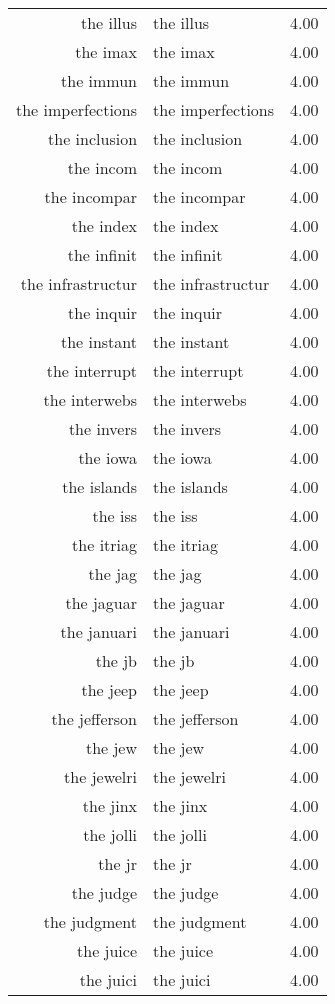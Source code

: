 \begin{table}[ht]
\begin{tabular}{rlr}
  the illus & the illus & 4.00 \\ 
  the imax & the imax & 4.00 \\ 
  the immun & the immun & 4.00 \\ 
  the imperfections & the imperfections & 4.00 \\ 
  the inclusion & the inclusion & 4.00 \\ 
  the incom & the incom & 4.00 \\ 
  the incompar & the incompar & 4.00 \\ 
  the index & the index & 4.00 \\ 
  the infinit & the infinit & 4.00 \\ 
  the infrastructur & the infrastructur & 4.00 \\ 
  the inquir & the inquir & 4.00 \\ 
  the instant & the instant & 4.00 \\ 
  the interrupt & the interrupt & 4.00 \\ 
  the interwebs & the interwebs & 4.00 \\ 
  the invers & the invers & 4.00 \\ 
  the iowa & the iowa & 4.00 \\ 
  the islands & the islands & 4.00 \\ 
  the iss & the iss & 4.00 \\ 
  the itriag & the itriag & 4.00 \\ 
  the jag & the jag & 4.00 \\ 
  the jaguar & the jaguar & 4.00 \\ 
  the januari & the januari & 4.00 \\ 
  the jb & the jb & 4.00 \\ 
  the jeep & the jeep & 4.00 \\ 
  the jefferson & the jefferson & 4.00 \\ 
  the jew & the jew & 4.00 \\ 
  the jewelri & the jewelri & 4.00 \\ 
  the jinx & the jinx & 4.00 \\ 
  the jolli & the jolli & 4.00 \\ 
  the jr & the jr & 4.00 \\ 
  the judge & the judge & 4.00 \\ 
  the judgment & the judgment & 4.00 \\ 
  the juice & the juice & 4.00 \\ 
  the juici & the juici & 4.00 \\ 

\end{tabular}
\end{table}
